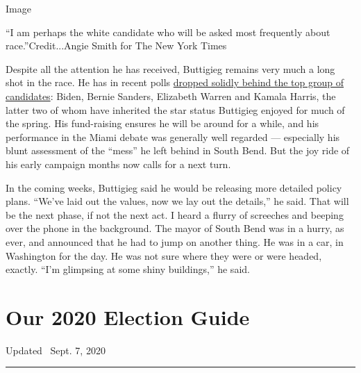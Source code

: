 Image

``I am perhaps the white candidate who will be asked most frequently
about race.''Credit...Angie Smith for The New York Times

Despite all the attention he has received, Buttigieg remains very much a
long shot in the race. He has in recent polls
\href{https://www.nytimes3xbfgragh.onion/interactive/2020/us/elections/democratic-polls.html}{dropped
solidly behind the top group of candidates}: Biden, Bernie Sanders,
Elizabeth Warren and Kamala Harris, the latter two of whom have
inherited the star status Buttigieg enjoyed for much of the spring. His
fund-raising ensures he will be around for a while, and his performance
in the Miami debate was generally well regarded --- especially his blunt
assessment of the ``mess'' he left behind in South Bend. But the joy
ride of his early campaign months now calls for a next turn.

In the coming weeks, Buttigieg said he would be releasing more detailed
policy plans. ``We've laid out the values, now we lay out the details,''
he said. That will be the next phase, if not the next act. I heard a
flurry of screeches and beeping over the phone in the background. The
mayor of South Bend was in a hurry, as ever, and announced that he had
to jump on another thing. He was in a car, in Washington for the day. He
was not sure where they were or were headed, exactly. ``I'm glimpsing at
some shiny buildings,'' he said.

\hypertarget{our-2020-election-guide}{%
\section{Our 2020 Election Guide}\label{our-2020-election-guide}}

Updated ~Sept. 7, 2020

\begin{center}\rule{0.5\linewidth}{\linethickness}\end{center}

